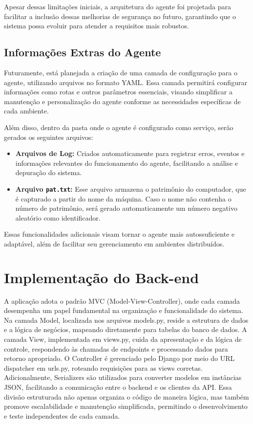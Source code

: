 Apesar dessas limitações iniciais, a arquitetura do agente foi projetada para facilitar a inclusão dessas melhorias de segurança no futuro, garantindo que o sistema possa evoluir para atender a requisitos mais robustos.


\subsection{Informações Extras do Agente}

Futuramente, está planejada a criação de uma camada de configuração para o agente, utilizando arquivos no formato YAML. Essa camada permitirá configurar informações como rotas e outros parâmetros essenciais, visando simplificar a manutenção e personalização do agente conforme as necessidades específicas de cada ambiente.

Além disso, dentro da pasta onde o agente é configurado como serviço, serão gerados os seguintes arquivos:

\begin{itemize}
    \item \textbf{Arquivos de Log:} Criados automaticamente para registrar erros, eventos e informações relevantes do funcionamento do agente, facilitando a análise e depuração do sistema.
    \item \textbf{Arquivo \texttt{pat.txt}:} Esse arquivo armazena o patrimônio do computador, que é capturado a partir do nome da máquina. Caso o nome não contenha o número de patrimônio, será gerado automaticamente um número negativo aleatório como identificador.
\end{itemize}

Essas funcionalidades adicionais visam tornar o agente mais autossuficiente e adaptável, além de facilitar seu gerenciamento em ambientes distribuídos.
 



\section{Implementação do Back-end}
A aplicação adota o padrão MVC (Model-View-Controller), onde cada camada desempenha um papel fundamental na organização e funcionalidade do sistema. Na camada Model, localizada nos arquivos models.py, reside a estrutura de dados e a lógica de negócios, mapeando diretamente para tabelas do banco de dados. A camada View, implementada em views.py, cuida da apresentação e da lógica de controle, respondendo às chamadas de endpoints e processando dados para retorno apropriado. O Controller é gerenciado pelo Django por meio do URL dispatcher em urls.py, roteando requisições para as views corretas. Adicionalmente, Serializers são utilizados para converter modelos em instâncias JSON, facilitando a comunicação entre o backend e os clientes da API. Essa divisão estruturada não apenas organiza o código de maneira lógica, mas também promove escalabilidade e manutenção simplificada, permitindo o desenvolvimento e teste independentes de cada camada.

